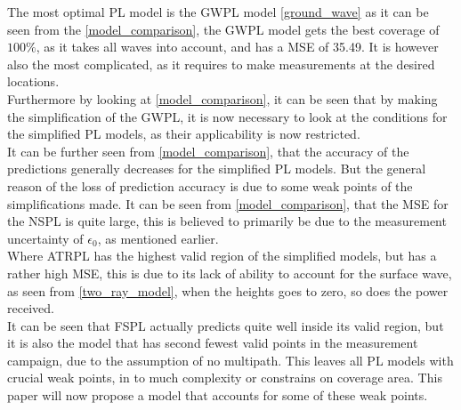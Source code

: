 The most optimal PL model is the GWPL model \eqref{ground_wave} as it can be seen from the  \autoref{model_comparison}, the GWPL model gets the best coverage of $100\%$, as it takes all waves into account, and has a MSE of 35.49. It is however also the most complicated, as it requires to make measurements at the desired locations.\\
Furthermore by looking at \autoref{model_comparison}, it can be seen that by making the simplification of the GWPL, it is now necessary to look at the conditions for the simplified PL models, as their applicability is now restricted.\\
It can be further seen from \autoref{model_comparison}, that the accuracy of the predictions generally decreases for the simplified PL models. But the general reason of the loss of prediction accuracy is due to some weak points of the simplifications made.
It can be seen from \autoref{model_comparison}, that the MSE for the NSPL is quite large, this is believed to primarily be due to the measurement uncertainty of $\epsilon_{0}$, as mentioned earlier. \\ 
Where ATRPL has the highest valid region of the simplified models, but has a rather high MSE, this is due to its lack of ability to account for the surface wave, as seen from \eqref{two_ray_model}, when the heights goes to zero, so does the power received. \\
It can be seen that FSPL actually predicts quite well inside its valid region, but it is also the model that has second fewest valid points in the measurement campaign, due to the assumption of no multipath. 
This leaves all PL models with crucial weak points, in to much complexity or constrains on coverage area. This paper will now propose a model that accounts for some of these weak points. 





